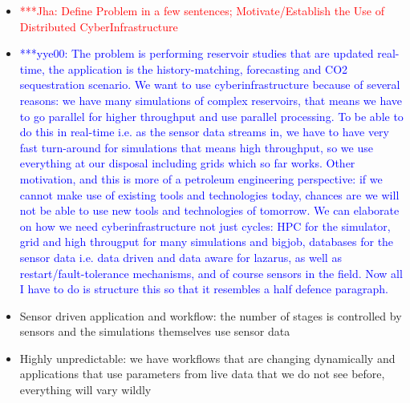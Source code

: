 \documentclass[conference,draft]{IEEEtran}
\newcommand{\jhanote}[1]{ {\textcolor{red} { ***Jha: #1 }}}
\newcommand{\yyenote}[1]{ {\textcolor{blue} { ***yye00: #1 }}}
\newcommand{\jhanote}[1]{}
\newcommand{\yyenote}[1]{}
\begin{document}
\begin{itemize}
\item \jhanote{Define Problem in a few sentences; Motivate/Establish the Use of Distributed CyberInfrastructure}
\item \yyenote{ The problem is performing reservoir studies that are updated real-time, the application is the history-matching, forecasting and CO2 sequestration scenario. We want to use cyberinfrastructure because of several reasons: we have many simulations of complex reservoirs, that means we have to go parallel for higher throughput and use parallel processing. To be able to do this in real-time i.e. as the sensor data streams in, we have to have very fast turn-around for simulations that means high throughput, so we use everything at our disposal including grids which so far works. Other motivation, and this is more of a petroleum engineering perspective: if we cannot make use of existing tools and technologies today, chances are we will not be able to use new tools and technologies of tomorrow. We can elaborate on how we need cyberinfrastructure not just cycles: HPC for the simulator, grid and high througput for many simulations and bigjob, databases for the sensor data i.e. data driven and data aware for lazarus, as well as restart/fault-tolerance mechanisms, and of course sensors in the field. Now all I have to do is structure this so that it resembles a half defence paragraph. }
 \item Sensor driven application and workflow: the number of stages is controlled by sensors and the simulations themselves use sensor data
 \item Highly unpredictable: we have workflows that are changing dynamically and applications that use parameters from live data that we do not see before, everything will vary wildly


\end{itemize}
\end{document}
